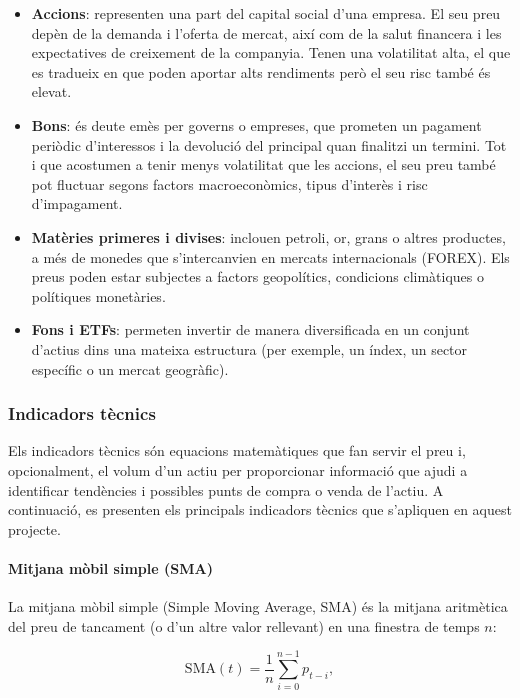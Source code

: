 \documentclass[12pt,a4paper,twoside]{book}
\begin{document}
\begin{itemize}
    \item \textbf{Accions}: representen una part del capital social d'una empresa. El seu preu depèn de la demanda i l'oferta de mercat, així com de la salut financera i les expectatives de creixement de la companyia. Tenen una volatilitat alta, el que es tradueix en que poden aportar alts rendiments però el seu risc també és elevat.

    \item \textbf{Bons}: és deute emès per governs o empreses, que prometen un pagament periòdic d'interessos i la devolució del principal quan finalitzi un termini. Tot i que acostumen a tenir menys volatilitat que les accions, el seu preu també pot fluctuar segons factors macroeconòmics, tipus d'interès i risc d'impagament.

    \item \textbf{Matèries primeres i divises}: inclouen petroli, or, grans o altres productes, a més de monedes que s'intercanvien en mercats internacionals (FOREX). Els preus poden estar subjectes a factors geopolítics, condicions climàtiques o polítiques monetàries.

    \item \textbf{Fons i ETFs}: permeten invertir de manera diversificada en un conjunt d'actius dins una mateixa estructura (per exemple, un índex, un sector específic o un mercat geogràfic).
\end{itemize}

\subsubsection{Indicadors tècnics}
Els indicadors tècnics són equacions matemàtiques que fan servir el preu i, opcionalment, el volum d'un actiu per proporcionar informació que ajudi a identificar tendències i possibles punts de compra o venda de l'actiu. A continuació, es presenten els principals indicadors tècnics que s'apliquen en aquest projecte.

\paragraph{Mitjana mòbil simple (SMA)}
La mitjana mòbil simple (Simple Moving Average, SMA) és la mitjana aritmètica del preu de tancament (o d'un altre valor rellevant) en una finestra de temps $n$:

\begin{equation}
    \text{SMA}(t) = \frac{1}{n} \sum_{i=0}^{n-1} p_{t-i},
\end{equation}
\end{document}
